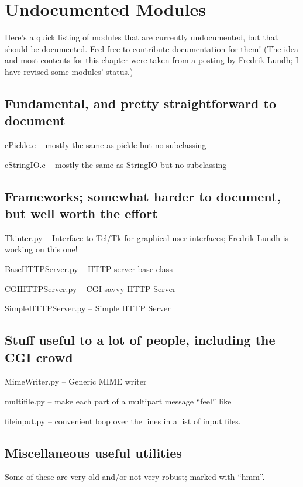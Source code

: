 \chapter{Undocumented Modules}

Here's a quick listing of modules that are currently undocumented, but
that should be documented.  Feel free to contribute documentation for
them!  (The idea and most contents for this chapter were taken from a
posting by Fredrik Lundh; I have revised some modules' status.)


\section{Fundamental, and pretty straightforward to document}

cPickle.c -- mostly the same as pickle but no subclassing

cStringIO.c -- mostly the same as StringIO but no subclassing


\section{Frameworks; somewhat harder to document, but
well worth the effort}

Tkinter.py -- Interface to Tcl/Tk for graphical user interfaces;
Fredrik Lundh is working on this one!

BaseHTTPServer.py -- HTTP server base class

CGIHTTPServer.py -- CGI-savvy HTTP Server

SimpleHTTPServer.py -- Simple HTTP Server


\section{Stuff useful to a lot of people, including the CGI crowd}

MimeWriter.py -- Generic MIME writer

multifile.py -- make each part of a multipart message ``feel'' like

fileinput.py -- convenient loop over the lines in a list of input files.


\section{Miscellaneous useful utilities}

Some of these are very old and/or not very robust; marked with ``hmm''.

